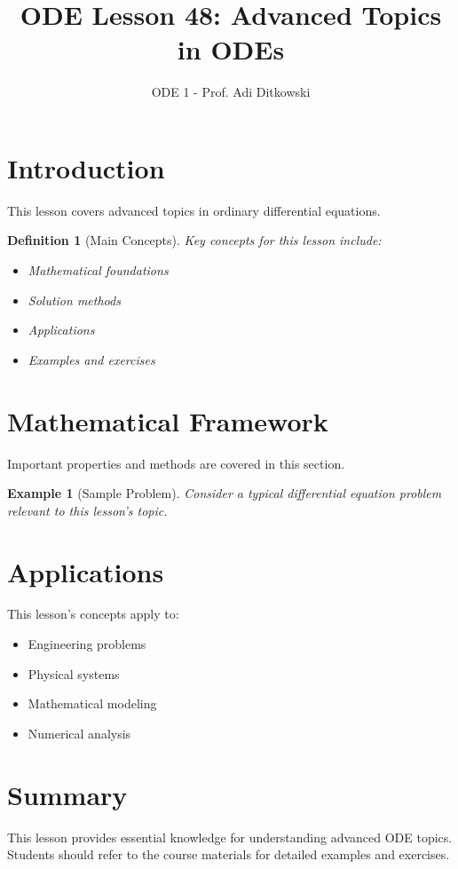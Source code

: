 \documentclass[12pt]{article}
\title{ODE Lesson 48: Advanced Topics in ODEs}
\author{ODE 1 - Prof. Adi Ditkowski}
\date{}
\newtheorem{definition}{Definition}
\newtheorem{example}{Example}
\begin{document}
\maketitle

\section{Introduction}

This lesson covers advanced topics in ordinary differential equations.

\begin{definition}[Main Concepts]
Key concepts for this lesson include:
\begin{itemize}
\item Mathematical foundations
\item Solution methods
\item Applications
\item Examples and exercises
\end{itemize}
\end{definition}

\section{Mathematical Framework}

\begin{keypoint}
Important properties and methods are covered in this section.
\end{keypoint}

\begin{example}[Sample Problem]
Consider a typical differential equation problem relevant to this lesson's topic.
\end{example}

\section{Applications}

This lesson's concepts apply to:
\begin{itemize}
\item Engineering problems
\item Physical systems
\item Mathematical modeling
\item Numerical analysis
\end{itemize}

\section{Summary}

This lesson provides essential knowledge for understanding advanced ODE topics.
Students should refer to the course materials for detailed examples and exercises.
\end{document}

